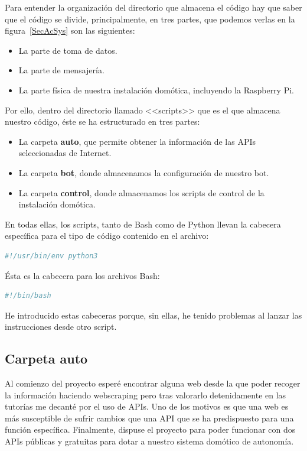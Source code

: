 Para entender la organización del directorio que almacena el código hay que saber que el código se divide, principalmente, en tres partes, que podemos verlas en la figura~\ref{SecAcSys} son las siguientes:

\begin{itemize}
    \item La parte de toma de datos.
    \item La parte de mensajería.
    \item La parte física de nuestra instalación domótica, incluyendo la Raspberry Pi.
\end{itemize}


Por ello, dentro del directorio llamado <<scripts>> que es el que almacena nuestro código, éste se ha estructurado en tres partes:
\begin{itemize}
    \item La carpeta \textbf{auto}, que permite obtener la información de las APIs seleccionadas de Internet.
    \item La carpeta \textbf{bot}, donde almacenamos la configuración de nuestro bot.
    \item La carpeta \textbf{control}, donde almacenamos los scripts de control de la instalación domótica.
\end{itemize}

En todas ellas, los scripts, tanto de Bash como de Python llevan la cabecera específica para el tipo de código contenido en el archivo:

\begin{lstlisting}[language=python,firstnumber=0, basicstyle=\normal]
#!/usr/bin/env python3
\end{lstlisting}

Ésta es la cabecera para los archivos Bash:
\begin{lstlisting}[language=sh,firstnumber=0, basicstyle=\normal]
#!/bin/bash
\end{lstlisting}

He introducido estas cabeceras porque, sin ellas, he tenido problemas al lanzar las instrucciones desde otro script.

\subsection{Carpeta auto}
Al comienzo del proyecto esperé encontrar alguna web desde la que poder recoger la información haciendo webscraping pero tras valorarlo detenidamente en las tutorías me decanté por el uso de APIs. Uno de los motivos es que una web es más susceptible de sufrir cambios que una API que se ha predispuesto para una función específica. Finalmente, dispuse el proyecto para poder funcionar con dos APIs públicas y gratuitas para dotar a nuestro sistema domótico de autonomía.

